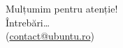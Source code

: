 \documentclass[compress]{beamer}
\begin{document}
\begin{frame}
  \begin{center}
    \huge
    Mulțumim pentru atenție!
    \\
    Întrebări\ldots
    \\
    (\href{mailto://contact@ubuntu.ro}{contact@ubuntu.ro})
  \end{center}
\end{frame}
\end{document}
